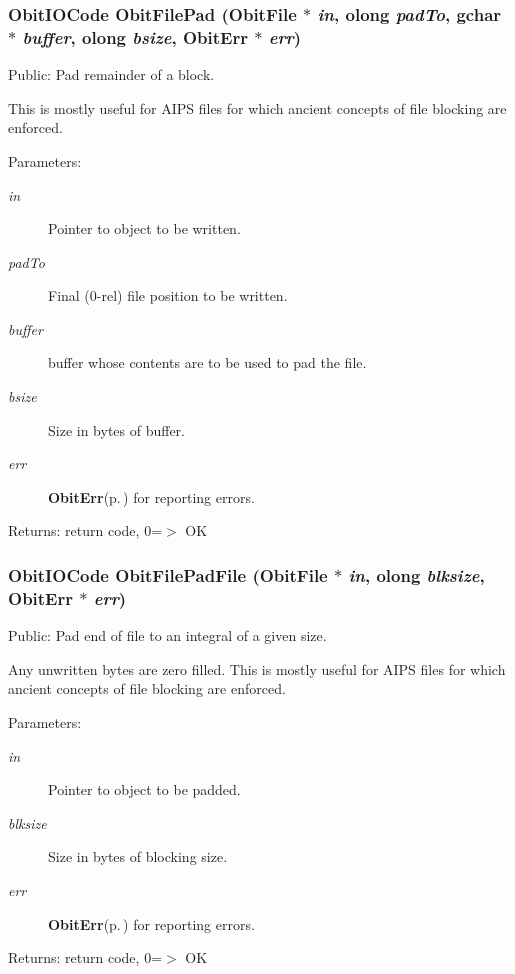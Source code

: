 \subsubsection{\setlength{\rightskip}{0pt plus 5cm}Obit\-IOCode Obit\-File\-Pad ({\bf Obit\-File} $\ast$ {\em in}, {\bf olong} {\em pad\-To}, gchar $\ast$ {\em buffer}, {\bf olong} {\em bsize}, {\bf Obit\-Err} $\ast$ {\em err})}\label{ObitFile_8c_a23}


Public: Pad remainder of a block. 

This is mostly useful for AIPS files for which ancient concepts of file blocking are enforced. \begin{Desc}
\item[Parameters:]
\begin{description}
\item[{\em in}]Pointer to object to be written. \item[{\em pad\-To}]Final (0-rel) file position to be written. \item[{\em buffer}]buffer whose contents are to be used to pad the file. \item[{\em bsize}]Size in bytes of buffer. \item[{\em err}]{\bf Obit\-Err}{\rm (p.\,\pageref{structObitErr})} for reporting errors. \end{description}
\end{Desc}
\begin{Desc}
\item[Returns:]return code, 0=$>$ OK \end{Desc}
\subsubsection{\setlength{\rightskip}{0pt plus 5cm}Obit\-IOCode Obit\-File\-Pad\-File ({\bf Obit\-File} $\ast$ {\em in}, {\bf olong} {\em blksize}, {\bf Obit\-Err} $\ast$ {\em err})}\label{ObitFile_8c_a24}


Public: Pad end of file to an integral of a given size. 

Any unwritten bytes are zero filled. This is mostly useful for AIPS files for which ancient concepts of file blocking are enforced. \begin{Desc}
\item[Parameters:]
\begin{description}
\item[{\em in}]Pointer to object to be padded. \item[{\em blksize}]Size in bytes of blocking size. \item[{\em err}]{\bf Obit\-Err}{\rm (p.\,\pageref{structObitErr})} for reporting errors. \end{description}
\end{Desc}
\begin{Desc}
\item[Returns:]return code, 0=$>$ OK \end{Desc}
